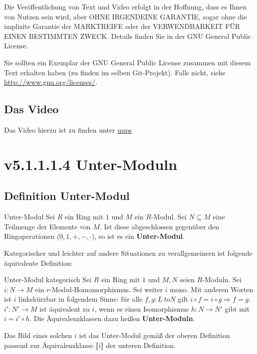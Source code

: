 \documentclass[a4paper]{amsart}
\theoremstyle{definition}
\begin{document}
Die Veröffentlichung von Text und Video erfolgt in der Hoffnung, dass es Ihnen von Nutzen sein wird,
aber OHNE IRGENDEINE GARANTIE, sogar ohne die implizite Garantie der MARKTREIFE oder der
VERWENDBARKEIT FÜR EINEN BESTIMMTEN ZWECK. Details finden Sie in der GNU General Public License.

Sie sollten ein Exemplar der GNU General Public License zusammen mit diesem Text erhalten haben
(zu finden im selben Git-Projekt).
Falls nicht, siehe \url{http://www.gnu.org/licenses/}.

\subsection*{Das Video}
Das Video hierzu ist zu finden unter
{\tiny
   \url{uups}
}

\section{v5.1.1.1.4 Unter-Moduln}

\subsection{Definition Unter-Modul}
\begin{Definition}{Unter-Modul}
   Sei $R$ ein Ring mit $1$ und $M$ ein $R$-Modul. Sei $N \subseteq M$ eine Teilmenge der Elemente von $M$. Ist diese abgeschlossen gegenüber den Ringoperationen ($0,1,+,-,\cdot$), so ist es ein \textbf{Unter-Modul}.
\end{Definition}

Kategorischer und leichter auf andere Situationen zu verallgemeinern ist folgende äquivalente Definition:
\begin{Definition}{Unter-Modul kategorisch}
   Sei $R$ ein Ring mit $1$ und $M,N$ seien $R$-Moduln. Sei $i \colon N \to M$ ein $r$-Modul-Homomorphismus. Sei weiter $i$ mono. Mit anderen Worten ist $i$ linkskürzbar in folgendem Sinne: für alle $f,g \colon L \ to N$ gilt $i \circ f = i \circ g \Rightarrow f = g$. $i' \colon N' \to M$ ist äquivalent zu $i$, wenn es einen Isomorphismus $h \colon N \to N'$ gibt mit $i = i' \circ h$. Die Äquivalenzklassen dazu heißen \textbf{Unter-Moduln}.
\end{Definition}
Das Bild eines solchen $i$ ist das Unter-Modul gemäß der oberen Definition passend zur Äquivalenzklasse $\llbracket i \rrbracket$ der unteren Definition.
\end{document}
